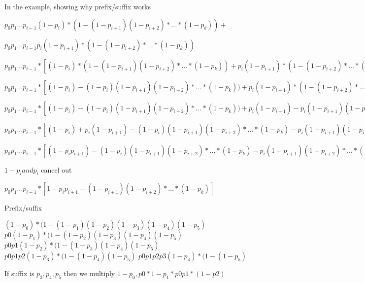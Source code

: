 \documentclass[fleqn]{article}
\begin{document}
In the example, showing why prefix/suffix works


$p_0p_1\dots p_{i-1} (1 - p_i) * (1 - (1-p_{i+1})(1-p_{i+2})*\dots*(1-p_k)) + $ \newline

$p_0p_1\dots p_{i-1} p_i (1 - p_{i+1}) * (1 - (1-p_{i+2})*\dots*(1-p_k))$ \newline

$p_0p_1\dots p_{i-1} * [ (1 - p_i) * (1 - (1-p_{i+1})(1-p_{i+2})*\dots*(1-p_k)) + p_i (1 - p_{i+1}) * (1 - (1-p_{i+2})*\dots*(1-p_k)) ] $ \newline

$p_0p_1\dots p_{i-1} * [ (1 - p_i) - (1 - p_i)(1-p_{i+1})(1-p_{i+2})*\dots*(1-p_k)) + p_i (1 - p_{i+1}) * (1 - (1-p_{i+2})*\dots*(1-p_k)) ] $ \newline

$p_0p_1\dots p_{i-1} * [ (1 - p_i) - (1 - p_i)(1-p_{i+1})(1-p_{i+2})*\dots*(1-p_k)) + p_i (1 - p_{i+1})   - p_i (1 - p_{i+1})(1-p_{i+2})*\dots*(1-p_k)) ] $ \newline

$p_0p_1\dots p_{i-1} * [ (1 - p_i) + p_i (1 - p_{i+1}) - (1 - p_i)(1-p_{i+1})(1-p_{i+2})*\dots*(1-p_k)    - p_i (1 - p_{i+1})(1-p_{i+2})*\dots*(1-p_k)) ] $ \newline

$p_0p_1\dots p_{i-1} * [ (1 - p_ip_{i+1}) - (1 - p_i)(1-p_{i+1})(1-p_{i+2})*\dots*(1-p_k)    - p_i (1 - p_{i+1})(1-p_{i+2})*\dots*(1-p_k)) ] $ \newline

$1-p_i and p_i$ cancel out \newline

$p_0p_1\dots p_{i-1} * [ 1 - p_ip_{i+1} -(1-p_{i+1})(1-p_{i+2})*\dots*(1-p_k)  ] $ \newline

Prefix/suffix

$ (1-p_0) * ( 1 - (1-p_1)(1-p_2)(1-p_3)(1-p_4)(1-p_5) $ \newline
$ p0(1-p_1) * ( 1 - (1-p_2)(1-p_3)(1-p_4)(1-p_5) $ \newline
$ p0p1(1-p_2) * ( 1 - (1-p_3)(1-p_4)(1-p_5) $ \newline
$ p0p1p2(1-p_3) * ( 1 - (1-p_4)(1-p_5) $ \newline
$ p0p1p2p3(1-p_4) * ( 1 - (1-p_5) $ \newline


If suffix is $p_3,p_4,p_5$ then we multiply $1-p_0, p0*1-p_1*p0p1*(1-p2)$
\end{document}
